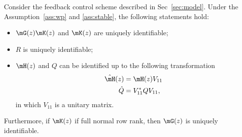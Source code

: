  \begin{theorem}\label{thm:gk}
    Consider the feedback control scheme described in Sec~\ref{sec:model}. Under the Assumption~\ref{ass:wp} and \ref{ass:stable}, the following statements hold:
    \begin{itemize}
      \item $\mG(z)\mK(z)$ and $\mK(z)$ are uniquely identifiable;
      \item $R$ is uniquely identifiable;
      \item $\mH(z)$ and $Q$ can be identified up to the following transformation
	\begin{equation}
	  \begin{aligned}
	    \hat{\mH}(z)&=\mH(z) V_{11}\\
	    \hat{Q}&=V^*_{11}QV_{11},
	  \end{aligned}
	\end{equation}
	in which $V_{11}$ is a unitary matrix. 
    \end{itemize}
    Furthermore, if $\mK(z)$ if full normal row rank, then $\mG(z)$ is uniquely identifiable.
  \end{theorem}

